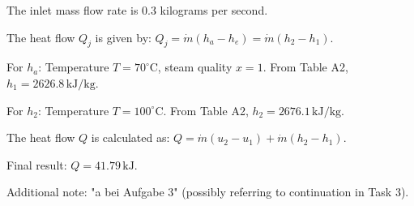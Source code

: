 The inlet mass flow rate is 0.3 kilograms per second.  

The heat flow \( Q_j \) is given by:  
\( Q_j = \dot{m} (h_a - h_e) = \dot{m} (h_2 - h_1) \).  

For \( h_a \):  
Temperature \( T = 70^\circ \text{C} \), steam quality \( x = 1 \).  
From Table A2, \( h_1 = 2626.8 \, \text{kJ/kg} \).  

For \( h_2 \):  
Temperature \( T = 100^\circ \text{C} \).  
From Table A2, \( h_2 = 2676.1 \, \text{kJ/kg} \).  

The heat flow \( Q \) is calculated as:  
\( Q = \dot{m} (u_2 - u_1) + \dot{m} (h_2 - h_1) \).  

Final result:  
\( Q = 41.79 \, \text{kJ} \).  

Additional note: "a bei Aufgabe 3" (possibly referring to continuation in Task 3).